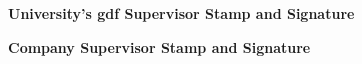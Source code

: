 \documentclass[14pt,oneside, a4paper]{report}
\def\defaultFont{ptm}
\renewcommand*{\familydefault}{\defaultFont}
\begin{document}
  \dominitoc
    
    \singlespacing{}%
    
    \noindent
    \begin{center}
        {\LARGE \textbf{University’s gdf Supervisor Stamp and Signature}}
    \end{center}
    \vspace{0.5cm}
    \begin{center}
    
        
    \end{center}
    \vspace{1cm}
    \noindent
    \begin{center}
        {\LARGE \textbf{Company Supervisor Stamp and Signature}}
    \end{center}
    \vspace{0.5cm}
    \begin{center}
        
    \end{center}
        \mbox{}
        \clearpage %
    
    

    

     
    \renewcommand*\contentsname{Table de matières}
    \begin{spacing}{1}
    \tableofcontents
    \end{spacing}

    
\end{document}
